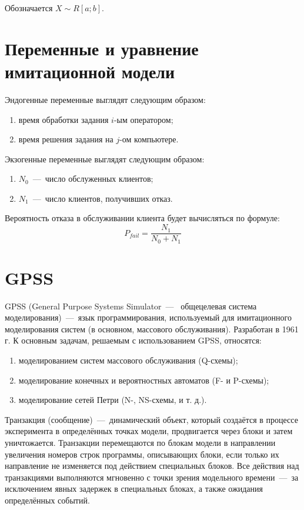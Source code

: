 Обозначается $X \sim R[a; b]$.

\clearpage

\section{Переменные и уравнение имитационной модели}

Эндогенные переменные выглядят следующим образом:
\begin{enumerate}
	\item время обработки задания $i$-ым оператором;
	\item время решения задания на $j$-ом компьютере.
\end{enumerate}

Экзогенные переменные выглядят следующим образом:
\begin{enumerate}
	\item $N_{0}$~---~число обслуженных клиентов;
	\item $N_{1}$~---~число клиентов, получивших отказ.
\end{enumerate}

Вероятность отказа в обслуживании клиента будет вычисляться по формуле:
\begin{equation}
	P_{fail} = \frac{N_{1}}{N_{0} + N_{1}}
\end{equation}

\section{GPSS}

GPSS (General Purpose Systems Simulator~---~ общецелевая система моделирования)~---~язык программирования, используемый для имитационного моделирования систем (в основном, массового обслуживания).
Разработан в 1961 г.
К основным задачам, решаемым с использованием GPSS, относятся:
\begin{enumerate}
	\item моделированием систем массового обслуживания (Q-схемы);
	\item моделирование конечных и вероятностных автоматов (F- и P-схемы);
	\item моделирование сетей Петри (N-, NS-схемы, и т. д.).
\end{enumerate}

Транзакция (сообщение)~---~динамический объект, который создаётся в процессе эксперимента в определённых точках модели, продвигается через блоки и затем уничтожается.
Транзакции перемещаются по блокам модели в направлении увеличения номеров строк программы, описывающих блоки, если только их направление не изменяется под действием специальных блоков.
Все действия над транзакциями выполняются мгновенно с точки зрения модельного времени~---~за исключением явных задержек в специальных блоках, а также ожидания определённых событий.